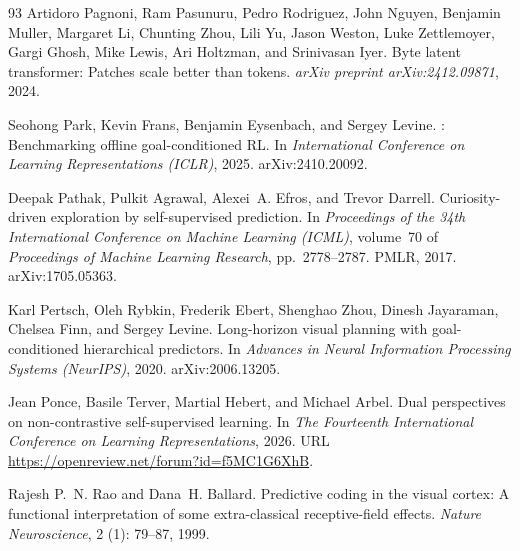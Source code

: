 \begin{thebibliography}{93}
Artidoro Pagnoni, Ram Pasunuru, Pedro Rodriguez, John Nguyen, Benjamin Muller,
  Margaret Li, Chunting Zhou, Lili Yu, Jason Weston, Luke Zettlemoyer, Gargi
  Ghosh, Mike Lewis, Ari Holtzman, and Srinivasan Iyer.
\newblock Byte latent transformer: Patches scale better than tokens.
\newblock \emph{arXiv preprint arXiv:2412.09871}, 2024.

Seohong Park, Kevin Frans, Benjamin Eysenbach, and Sergey Levine.
: Benchmarking offline goal-conditioned {RL}.
\newblock In \emph{International Conference on Learning Representations
  (ICLR)}, 2025.
\newblock arXiv:2410.20092.

Deepak Pathak, Pulkit Agrawal, Alexei~A. Efros, and Trevor Darrell.
\newblock Curiosity-driven exploration by self-supervised prediction.
\newblock In \emph{Proceedings of the 34th International Conference on Machine
  Learning (ICML)}, volume~70 of \emph{Proceedings of Machine Learning
  Research}, pp.\  2778--2787. PMLR, 2017.
\newblock arXiv:1705.05363.

Karl Pertsch, Oleh Rybkin, Frederik Ebert, Shenghao Zhou, Dinesh Jayaraman,
  Chelsea Finn, and Sergey Levine.
\newblock Long-horizon visual planning with goal-conditioned hierarchical
  predictors.
\newblock In \emph{Advances in Neural Information Processing Systems
  (NeurIPS)}, 2020.
\newblock arXiv:2006.13205.

Jean Ponce, Basile Terver, Martial Hebert, and Michael Arbel.
\newblock Dual perspectives on non-contrastive self-supervised learning.
\newblock In \emph{The Fourteenth International Conference on Learning
  Representations}, 2026.
\newblock URL \url{https://openreview.net/forum?id=f5MC1G6XhB}.

Rajesh P.~N. Rao and Dana~H. Ballard.
\newblock Predictive coding in the visual cortex: A functional interpretation
  of some extra-classical receptive-field effects.
\newblock \emph{Nature Neuroscience}, 2 (1): 79--87, 1999.


\end{thebibliography}
